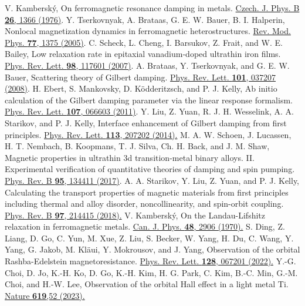 \documentclass[prl,aps,twocolumn,showpacs,citeautoscript,reprint,superscriptaddress]{revtex4-1}
\newcommand{\DOI}[1]{\href{https://doi.org/#1}}
\begin{document}
\begin{thebibliography}{00}
V. Kambersk{\'y}, On ferromagnetic resonance damping in metals. \DOI{10.1007/BF01587621}{Czech. J. Phys. B {\bf 26}, 1366 (1976)}.
Y. Tserkovnyak, A. Brataas, G. E. W. Bauer, B. I. Halperin, Nonlocal magnetization dynamics in ferromagnetic heterostructures. \DOI{10.1103/RevModPhys.77.1375}{Rev. Mod. Phys. {\bf 77}, 1375 (2005)}.
C. Scheck, L. Cheng, I. Barsukov, Z. Frait, and W. E. Bailey, Low relaxation rate in epitaxial vanadium-doped ultrathin iron films. \DOI{10.1103/PhysRevLett.98.117601}{Phys. Rev. Lett. {\bf 98}, 117601 (2007)}.
A. Brataas, Y. Tserkovnyak, and G. E. W. Bauer, Scattering theory of Gilbert damping. \DOI{10.1103/PhysRevLett.101.037207}{Phys. Rev. Lett. {\bf 101}, 037207 (2008)}.
H. Ebert, S. Mankovsky, D. K{\"o}dderitzsch, and P. J. Kelly, Ab initio calculation of the Gilbert damping parameter via the linear response formalism. \DOI{10.1103/PhysRevLett.107.066603}{Phys. Rev. Lett. {\bf 107}, 066603 (2011)}.
Y. Liu, Z. Yuan, R. J. H. Wesselink, A. A. Starikov, and P. J. Kelly, Interface enhancement of Gilbert damping from first principles. \DOI{10.1103/PhysRevLett.113.207202}{Phys. Rev. Lett. {\bf 113}, 207202 (2014).}
M. A. W. Schoen, J. Lucassen, H. T. Nembach, B. Koopmans, T. J. Silva, Ch. H. Back, and J. M. Shaw, Magnetic properties in ultrathin 3d transition-metal binary alloys. II. Experimental verification of quantitative theories of damping and spin pumping. \DOI{10.1103/PhysRevB.95.134411}{Phys. Rev. B {\bf 95}, 134411 (2017)}.
A. A. Starikov, Y. Liu, Z. Yuan, and P. J. Kelly, Calculating the transport properties of magnetic materials from first principles including thermal and alloy disorder, noncollinearity, and spin-orbit coupling. \DOI{10.1103/PhysRevB.97.214415}{Phys. Rev. B {\bf 97}, 214415 (2018).}
V. Kambersk{\'y}, On the Landau-Lifshitz relaxation in ferromagnetic metals. \DOI{10.1139/p70-361}{Can. J. Phys. {\bf 48}, 2906 (1970).}
S. Ding, Z. Liang, D. Go, C. Yun, M. Xue, Z. Liu, S. Becker, W. Yang, H. Du, C. Wang, Y. Yang, G. Jakob, M. Kl{\"a}ui, Y. Mokrousov, and J. Yang, Observation of the orbital Rashba-Edelstein magnetoresistance. \DOI{10.1103/PhysRevLett.128.067201}{Phys. Rev. Lett. {\bf 128}, 067201 (2022).}
Y.-G. Choi, D. Jo, K.-H. Ko, D. Go, K.-H. Kim, H. G. Park, C. Kim, B.-C. Min, G.-M. Choi, and H.-W. Lee, Observation of the orbital Hall effect in a light metal Ti. \DOI{10.1038/s41586-023-06101-9}{Nature {\bf 619},52 (2023).}

\end{thebibliography}
\end{document}
